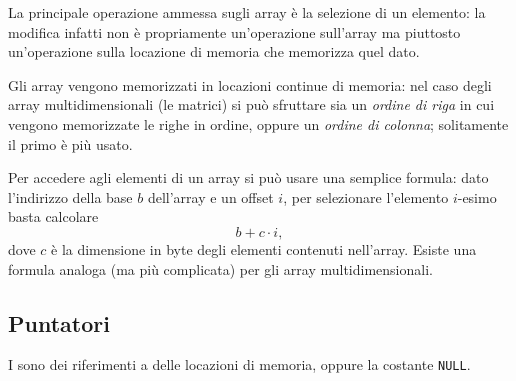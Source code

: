 La principale operazione ammessa sugli array è la selezione di un elemento: la modifica infatti non è propriamente un'operazione sull'array ma piuttosto un'operazione sulla locazione di memoria che memorizza quel dato.

Gli array vengono memorizzati in locazioni continue di memoria: nel caso degli array multidimensionali (le matrici) si può sfruttare sia un \emph{ordine di riga} in cui vengono memorizzate le righe in ordine, oppure un \emph{ordine di colonna}; solitamente il primo è più usato.

Per accedere agli elementi di un array si può usare una semplice formula: dato l'indirizzo della base $b$ dell'array e un offset $i$, per selezionare l'elemento $i$-esimo basta calcolare \[
    b + c \cdot i,
\] dove $c$ è la dimensione in byte degli elementi contenuti nell'array. Esiste una formula analoga (ma più complicata) per gli array multidimensionali.

\subsection*{Puntatori}

I  sono dei riferimenti a delle locazioni di memoria, oppure la costante \texttt{NULL}.
